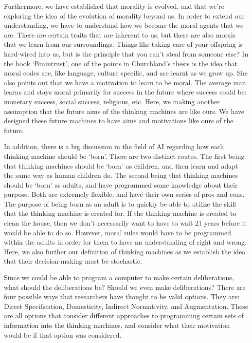 \documentclass[11pt, oneside]{article}
\begin{document}
\par 
Furthermore, we have established that morality is evolved, and that we're exploring the idea of the evolution of morality beyond us. In order to extend our understanding, we have to understand how we become the moral agents that we are. There are certain traits that are inherent to us, but there are also morals that we learn from our surroundings. Things like taking care of your offspring is hard-wired into us, but is the principle that you can't steal from someone else? 
In the book `Braintrust', one of the points in Churchland's thesis is the idea that moral codes are, like language, culture specific, and are learnt as we grow up. She also points out that we have a motivation to learn to be moral. The average man learns and stays moral primarily for success in the future where success could be: monetary success, social success, religious, etc. Here, we making another assumption that the future aims of the thinking machines are like ours. 
We have designed these future machines to have aims and motivations like ours of the future.

\par 
In addition, there is a big discussion in the field of AI regarding how each thinking machine should be `born'. There are two distinct routes. 
The first being that thinking machines should be `born' as children, and then learn and adapt the same way as human children do. 
The second being that thinking machines should be `born' as adults, and have programmed some knowledge about their purpose. Both are extremely flexible, and have their own series of pros and cons. 
The purpose of being born as an adult is to quickly be able to utilize the skill that the thinking machine is created for. If the thinking machine is created to clean the house, then we don't necessarily want to have to wait 21 years before it would be able to do so. 
However, moral rules would have to be programmed within the adults in order for them to have an understanding of right and wrong. Here, we also further our definition of thinking machines as we establish the idea that their decision-making must be stochastic. 

\par Since we could be able to program a computer to make certain deliberations, what should the deliberations be? Should we even make deliberations? There are four possible ways that researchers have thought to be valid options. They are: Direct Specification, Domesticity, Indirect Normativity, and Augmentation. These are all options that consider different approaches to programming certain sets of information into the thinking machines, and consider what their motivation would be if that option was considered. 
\end{document}
